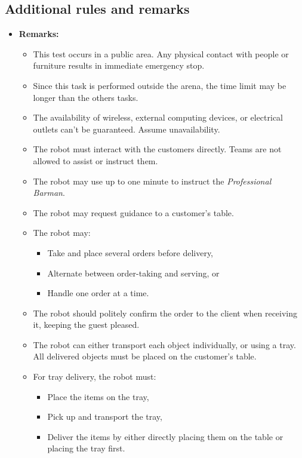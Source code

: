 \subsection*{Additional rules and remarks}
\begin{itemize}
	\item \textbf{Remarks:}
	\begin{itemize}
		\item This test occurs in a public area. Any physical contact with people or furniture results in immediate emergency stop.
		\item Since this task is performed outside the arena, the time limit may be longer than the others tasks.
		\item The availability of wireless, external computing devices, or electrical outlets can't be guaranteed. Assume unavailability.
		\item The robot must interact with the customers directly. Teams are not allowed to assist or instruct them.
		\item The robot may use up to one minute to instruct the \textit{Professional Barman}.
		\item The robot may request guidance to a customer's table.
		\item The robot may:
        \begin{itemize}[nosep]
            \item Take and place several orders before delivery,
            \item Alternate between order-taking and serving, or
            \item Handle one order at a time.
        \end{itemize}
		\item The robot should politely confirm the order to the client when receiving it, keeping the guest pleased.
		\item The robot can either transport each object individually, or using a tray. All delivered objects must be placed on the customer's table.
		\item For tray delivery, the robot must:
        \begin{itemize}[nosep]
            \item Place the items on the tray,
            \item Pick up and transport the tray,
            \item Deliver the items by either directly placing them on the table or placing the tray first.
        \end{itemize}

\end{itemize}
\end{itemize}
